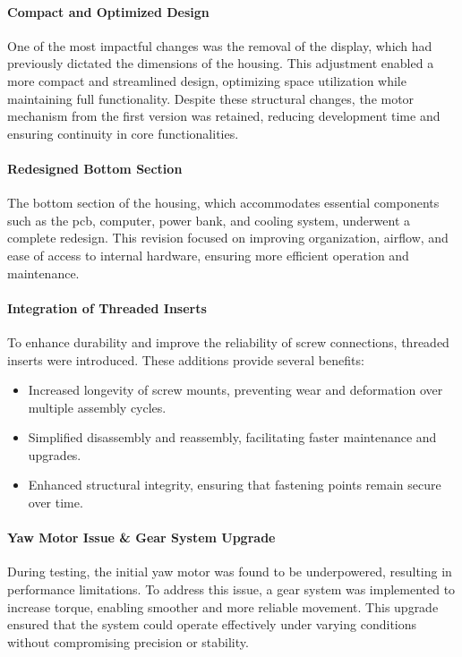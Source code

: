 \paragraph{Compact and Optimized Design}
One of the most impactful changes was the removal of the display, which had previously dictated the dimensions of the housing. This adjustment enabled a more compact and streamlined design, optimizing space utilization while maintaining full functionality. Despite these structural changes, the motor mechanism from the first version was retained, reducing development time and ensuring continuity in core functionalities.  

\paragraph{Redesigned Bottom Section}  
The bottom section of the housing, which accommodates essential components such as the \acrshort{pcb}, computer, power bank, and cooling system, underwent a complete redesign. This revision focused on improving organization, airflow, and ease of access to internal hardware, ensuring more efficient operation and maintenance.  

\paragraph{Integration of Threaded Inserts}  
To enhance durability and improve the reliability of screw connections, threaded inserts were introduced. These additions provide several benefits:  
\begin{itemize}  
	\item Increased longevity of screw mounts, preventing wear and deformation over multiple assembly cycles.  
	\item Simplified disassembly and reassembly, facilitating faster maintenance and upgrades.  
	\item Enhanced structural integrity, ensuring that fastening points remain secure over time.  
\end{itemize}  

\paragraph{Yaw Motor Issue \& Gear System Upgrade}  
During testing, the initial yaw motor was found to be underpowered, resulting in performance limitations. To address this issue, a gear system was implemented to increase torque, enabling smoother and more reliable movement. This upgrade ensured that the system could operate effectively under varying conditions without compromising precision or stability.  

